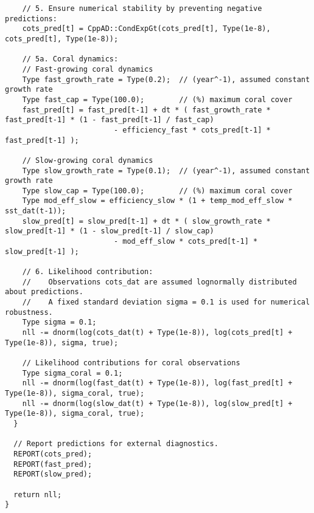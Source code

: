 \begin{lstlisting}
    // 5. Ensure numerical stability by preventing negative predictions:
    cots_pred[t] = CppAD::CondExpGt(cots_pred[t], Type(1e-8), cots_pred[t], Type(1e-8));
    
    // 5a. Coral dynamics:
    // Fast-growing coral dynamics
    Type fast_growth_rate = Type(0.2);  // (year^-1), assumed constant growth rate
    Type fast_cap = Type(100.0);        // (%) maximum coral cover
    fast_pred[t] = fast_pred[t-1] + dt * ( fast_growth_rate * fast_pred[t-1] * (1 - fast_pred[t-1] / fast_cap)
                         - efficiency_fast * cots_pred[t-1] * fast_pred[t-1] );
                         
    // Slow-growing coral dynamics
    Type slow_growth_rate = Type(0.1);  // (year^-1), assumed constant growth rate
    Type slow_cap = Type(100.0);        // (%) maximum coral cover
    Type mod_eff_slow = efficiency_slow * (1 + temp_mod_eff_slow * sst_dat(t-1));
    slow_pred[t] = slow_pred[t-1] + dt * ( slow_growth_rate * slow_pred[t-1] * (1 - slow_pred[t-1] / slow_cap)
                         - mod_eff_slow * cots_pred[t-1] * slow_pred[t-1] );

    // 6. Likelihood contribution:
    //    Observations cots_dat are assumed lognormally distributed about predictions.
    //    A fixed standard deviation sigma = 0.1 is used for numerical robustness.
    Type sigma = 0.1;
    nll -= dnorm(log(cots_dat(t) + Type(1e-8)), log(cots_pred[t] + Type(1e-8)), sigma, true);
    
    // Likelihood contributions for coral observations
    Type sigma_coral = 0.1;
    nll -= dnorm(log(fast_dat(t) + Type(1e-8)), log(fast_pred[t] + Type(1e-8)), sigma_coral, true);
    nll -= dnorm(log(slow_dat(t) + Type(1e-8)), log(slow_pred[t] + Type(1e-8)), sigma_coral, true);
  }

  // Report predictions for external diagnostics.
  REPORT(cots_pred);
  REPORT(fast_pred);
  REPORT(slow_pred);

  return nll;
}
\end{lstlisting}

